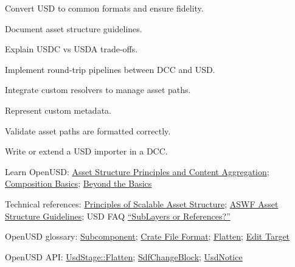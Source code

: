 
\begin{Objectives}
  \item Convert USD to common formats and ensure fidelity.
  \item Document asset structure guidelines.
  \item Explain USDC vs USDA trade-offs.
  \item Implement round-trip pipelines between DCC and USD.
  \item Integrate custom resolvers to manage asset paths.
  \item Represent custom metadata.
  \item Validate asset paths are formatted correctly.
  \item Write or extend a USD importer in a DCC.
\end{Objectives}

\begin{Resources}
  \item Learn OpenUSD: \href{https://docs.nvidia.com/learn-openusd/latest/asset-structure/index.html}{Asset Structure Principles and Content Aggregation};
        \href{https://docs.nvidia.com/learn-openusd/latest/composition-basics/index.html}{Composition Basics};
        \href{https://docs.nvidia.com/learn-openusd/latest/beyond-basics/index.html}{Beyond the Basics}
  \item Technical references: \href{https://docs.omniverse.nvidia.com/usd/latest/learn-openusd/independent/asset-structure-principles.html}{Principles of Scalable Asset Structure};
        \href{https://github.com/usd-wg/assets/blob/main/docs/asset-structure-guidelines.md}{ASWF Asset Structure Guidelines};
        USD FAQ \href{https://openusd.org/release/usdfaq.html#i-have-some-layers-i-want-to-combine-should-i-use-sublayers-or-references}{``SubLayers or References?''}
  \item OpenUSD glossary: \href{https://openusd.org/release/glossary.html#usdglossary-subcomponent}{Subcomponent}; \href{https://openusd.org/release/glossary.html#crate-file-format}{Crate File Format}; \href{https://openusd.org/release/glossary.html#flatten}{Flatten}; \href{https://openusd.org/release/glossary.html#edittarget}{Edit Target}
  \item OpenUSD API: \href{https://openusd.org/release/api/class_usd_stage.html}{UsdStage::Flatten};
        \href{https://openusd.org/release/api/class_sdf_change_block.html}{SdfChangeBlock};
        \href{https://openusd.org/release/api/class_usd_notice.html}{UsdNotice}
\end{Resources}

